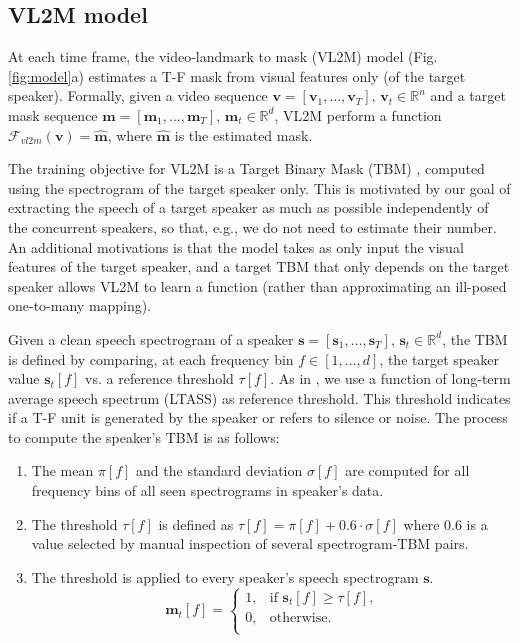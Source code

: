 \documentclass{article}
\begin{document}
\subsection{VL2M model}
\label{ssec:vidland2mask}
At each time frame, the video-landmark to mask (VL2M)  model (Fig. \ref{fig:model}a) estimates a T-F mask from visual features only (of the target speaker).
Formally, given a video sequence $\textbf{v} = [\textbf{v}_1, \dots ,\textbf{v}_T], \, \textbf{v}_t \in \mathbb{R}^n$ and a target mask sequence $\textbf{m} = [\textbf{m}_1, \dots ,\textbf{m}_T], \, \textbf{m}_t \in \mathbb{R}^d$, VL2M perform a function $\mathcal{F}_{vl2m}(\textbf{v}) = \mathbf{\hat{m}}$, where $\mathbf{\hat{m}}$ is the estimated mask. 

The training objective for VL2M is a Target Binary Mask (TBM) \cite{Anzalone2006, Kjems2009}, computed using the spectrogram of the target speaker only. This is motivated by our goal of
extracting the speech of a target speaker as much as possible independently of the concurrent speakers, so that, e.g., we do not need to estimate their number. 
An additional motivations is that the model takes as only input the visual features of the target speaker, and a target TBM that only depends on the target speaker allows VL2M to learn a function (rather than approximating an ill-posed one-to-many mapping).


Given a clean speech spectrogram of a speaker $\mathbf{s}=[\mathbf{s}_1, \dots, \mathbf{s}_T], \, \mathbf{s}_t \in \mathbb{R}^d$, the TBM is defined by comparing, at each frequency bin $f \in [1, \dots, d]$, the target speaker value $\textbf{s}_t[f]$ vs. a reference threshold $\tau[f]$. As in \cite{gabbay_seeing_2017}, we use a function of long-term average speech spectrum (LTASS) as reference threshold. This threshold indicates if a T-F unit is generated by the speaker or refers to silence or noise. The process to compute the speaker's TBM is as follows:
\begin{enumerate}
    \item The mean $\pi[f]$ and the standard deviation $\sigma[f]$ are computed for all frequency bins of all seen spectrograms in speaker's data.
    \item The threshold $\tau[f]$ is defined as $\tau[f] = \pi[f] + 0.6 \cdot \sigma[f]$    where $0.6$ is a value selected by manual inspection of several spectrogram-TBM pairs.
    \item The threshold is applied to every speaker's speech spectrogram $\mathbf{s}$.
    \[	\mathbf{m}_t[f] = \left\{
        \begin{array}{ll}
        1, & \text{if $\mathbf{s}_t[f] \geq \tau[f]$,}  \\
        0, & \text{otherwise.} \\
        \end{array}
        \right. \]
\end{enumerate}
\end{document}
